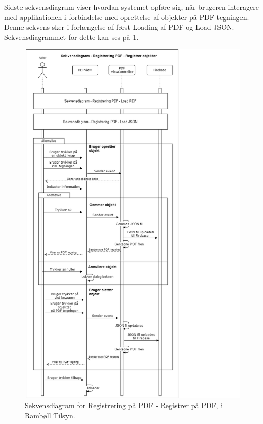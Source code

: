 Sidste sekvensdiagram viser hvordan systemet opføre sig, når brugeren interagere med applikationen i forbindelse med oprettelse af objekter på PDF tegningen. Denne sekvens sker i forlængelse af først Loading af PDF og Load JSON. Sekvensdiagrammet for dette kan ses på \ref{fig:RegistrerObjekterSekvensDiagram}.
\begin{figure}[H] %
	\centering
	\includegraphics[height=18cm, width=15cm]{../ArkitekturDesign/Design/RegisterPDF/RegistrerObjekterSekvensDiagram}
	\caption{Sekvensdiagram for Registrering på PDF - Registrer på PDF, i Rambøll Tilsyn.}
	\label{fig:RegistrerObjekterSekvensDiagram}
\end{figure}

\clearpage

